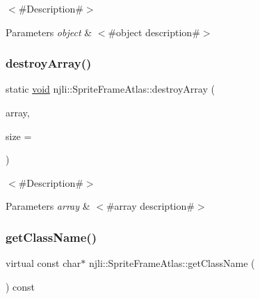 $<$\#\+Description\#$>$


\begin{DoxyParams}{Parameters}
{\em object} & $<$\#object description\#$>$ \\
\hline
\end{DoxyParams}
\mbox{\label{classnjli_1_1_sprite_frame_atlas_ab9893ed4aa85eff7606c50b581f6986f}} 
\subsubsection{\texorpdfstring{destroy\+Array()}{destroyArray()}}
{\footnotesize\ttfamily static \mbox{\hyperlink{_thread_8h_af1e856da2e658414cb2456cb6f7ebc66}{void}} njli\+::\+Sprite\+Frame\+Atlas\+::destroy\+Array (\begin{DoxyParamCaption}\item[{\mbox{\hyperlink{classnjli_1_1_sprite_frame_atlas}{Sprite\+Frame\+Atlas}} $\ast$$\ast$}]{array,  }\item[{const \mbox{\hyperlink{_util_8h_a10e94b422ef0c20dcdec20d31a1f5049}{u32}}}]{size = {} }\end{DoxyParamCaption})\hspace{0.3cm}{\ttfamily [static]}}

$<$\#\+Description\#$>$


\begin{DoxyParams}{Parameters}
{\em array} & $<$\#array description\#$>$ \\
\hline
\end{DoxyParams}
\mbox{\label{classnjli_1_1_sprite_frame_atlas_a8c65d9841be00711e2313fab7b356fbd}} 
\subsubsection{\texorpdfstring{get\+Class\+Name()}{getClassName()}}
{\footnotesize\ttfamily virtual const char$\ast$ njli\+::\+Sprite\+Frame\+Atlas\+::get\+Class\+Name (\begin{DoxyParamCaption}{ }\end{DoxyParamCaption}) const\hspace{0.3cm}{\ttfamily [virtual]}}

